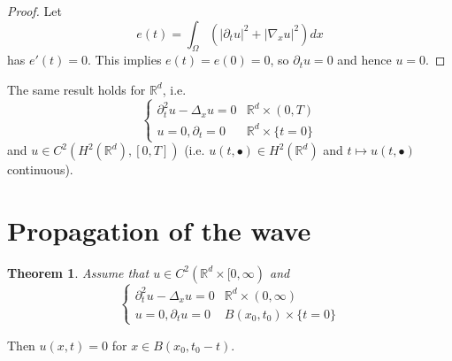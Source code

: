 \documentclass{report}
\theoremstyle{tommy}
\newtheorem{thm}[defn]{Theorem}
\begin{document}
  \begin{proof}
    Let 
    \[e(t) = \int_{\Omega} (|\partial_t u|^2 + |\nabla_x u|^2) dx\]
    has \(e'(t) = 0\). This implies \(e(t) = e(0) = 0\), so \(\partial_t u = 0\) and hence \(u=0\).
  \end{proof}
  The same result holds for \(\mathbb{R}^d\), i.e.
  \[\begin{cases}
    \partial_t^2 u - \Delta_x u = 0 &\mathbb{R}^d \times (0,T) \\
    u = 0, \partial_t = 0 &\mathbb{R}^d \times \{t = 0\}
  \end{cases}\]
  and \(u \in C^2(H^2(\mathbb{R}^d), [0,T])\) (i.e. \(u(t,\bullet) \in H^2(\mathbb{R}^d)\) and \(t \mapsto u(t,\bullet)\) continuous).

  \section{Propagation of the wave}
  \begin{thm}
    Assume that \(u \in C^2(\mathbb{R}^d \times [0,\infty)\) and 
    \[\begin{cases}
      \partial_t^2 u - \Delta_x u = 0&\mathbb{R}^d \times (0,\infty) \\
      u = 0, \partial_t u = 0 &B(x_0, t_0) \times \{t=0\}
    \end{cases}\]
  \end{thm}

  Then \(u(x,t) = 0\) for \(x \in B(x_0, t_0-t)\).
\end{document}
